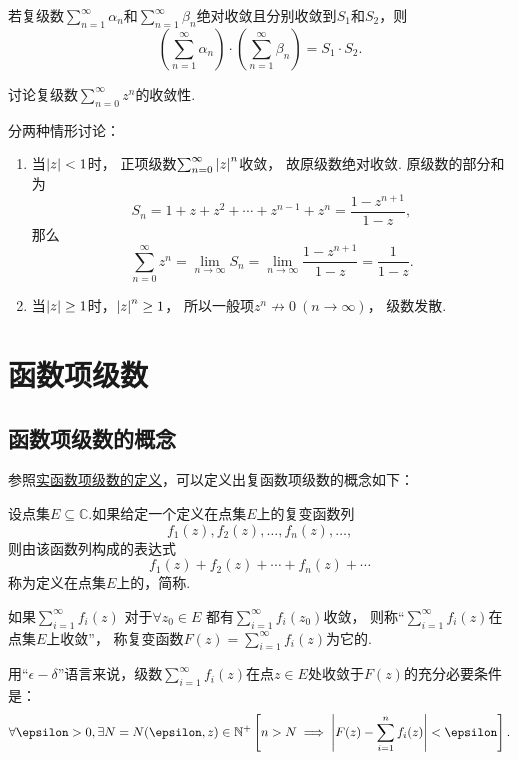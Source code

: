 \begin{theorem}
若复级数\(\sum_{n=1}^\infty \alpha_n\)和\(\sum_{n=1}^\infty \beta_n\)绝对收敛且分别收敛到\(S_1\)和\(S_2\)，则\[
\left( \sum_{n=1}^\infty \alpha_n \right) \cdot \left( \sum_{n=1}^\infty \beta_n \right) = S_1 \cdot S_2.
\]
\end{theorem}

\begin{example}[复等比级数]\label{example:解析级数的级数表示.复等比级数}
讨论复级数\(\sum_{n=0}^\infty z^n\)的收敛性.
\begin{solution}
分两种情形讨论：\begin{enumerate}
\item 当\(\abs{z} < 1\)时，
正项级数\(\sum_{n=0}^\infty \abs{z}^n\)收敛，
故原级数绝对收敛.
原级数的部分和为\[
S_n = 1 + z + z^2 + \dotsb + z^{n-1} + z^n = \frac{1-z^{n+1}}{1-z},
\]那么\[
\sum_{n=0}^\infty z^n = \lim_{n\to\infty} S_n = \lim_{n\to\infty} \frac{1-z^{n+1}}{1-z} = \frac{1}{1-z}.
\]

\item 当\(\abs{z} \geq 1\)时，\(\abs{z}^n \geq 1\)，
所以一般项\(z^n \not\to 0\ (n\to\infty)\)，
级数发散.
\end{enumerate}
\end{solution}
\end{example}

\section{函数项级数}
\subsection{函数项级数的概念}
参照\hyperref[definition:无穷级数.实函数项级数的概念]{实函数项级数的定义}，可以定义出复函数项级数的概念如下：
\begin{definition}\label{definition:解析函数的级数表示.收敛级数}
设点集\(E \subseteq \mathbb{C}\).如果给定一个定义在点集\(E\)上的复变函数列\[
f_1(z), f_2(z), \dotsc, f_n(z), \dotsc,
\]则由该函数列构成的表达式\[
f_1(z) + f_2(z) + \dotsb + f_n(z) + \dotsb
\]称为定义在点集\(E\)上的，简称.

如果\(\sum_{i=1}^\infty f_i(z)\)%
对于\(\forall z_0 \in E\)%
都有\(\sum_{i=1}^\infty f_i(z_0)\)收敛，
则称“\(\sum_{i=1}^\infty f_i(z)\)在点集\(E\)上收敛”，
称复变函数\(F(z) = \sum_{i=1}^\infty f_i(z)\)为它的.
\end{definition}
用“\(\epsilon-\delta\)”语言来说，级数\(\sum_{i=1}^\infty f_i(z)\)在点\(z \in E\)处收敛于\(F(z)\)的充分必要条件是：\[
\forall \epsilon > 0, \exists N = N(\epsilon, z) \in \mathbb{N}^+ \left[
n > N \implies \abs{F(z) - \sum_{i=1}^n f_i(z)} < \epsilon
\right].
\]

